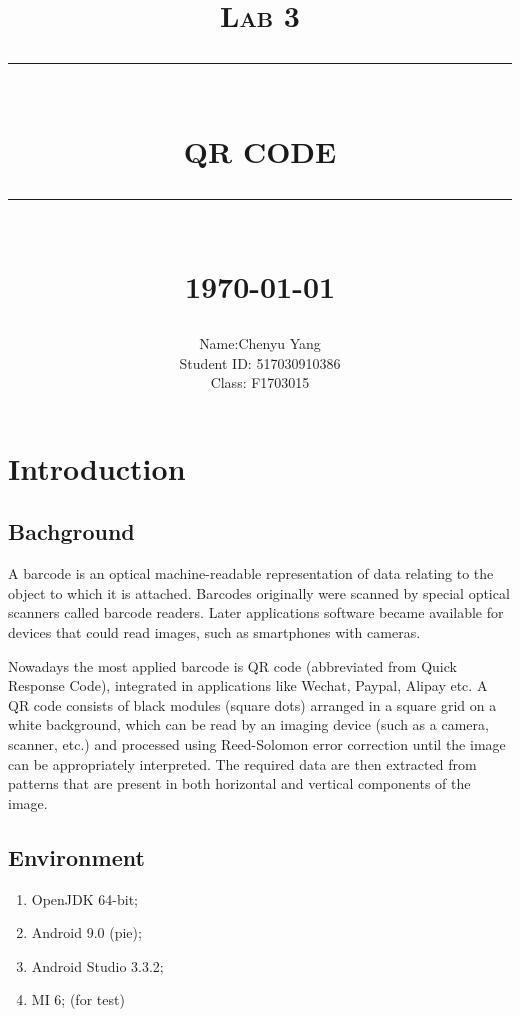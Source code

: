 \documentclass[12pt]{report}
\newcommand{\HRule}[1]{\rule{\linewidth}{#1}}
\begin{document}
\title{ \normalsize \textsc{Lab 3}
        \\ [2.0cm]
        \HRule{0.5pt} \\
        \LARGE \textbf{\uppercase{QR Code}}
        \HRule{2pt} \\ [0.5cm]
        \normalsize \today \vspace*{5\baselineskip}}

\date{}

\author{
        Name:Chenyu Yang \\
        Student ID: 517030910386 \\ 
        Class: F1703015 }

\maketitle
\tableofcontents
\newpage

\sectionfont{\scshape}


\section{Introduction}
\subsection{Bachground}
A barcode is an optical machine-readable representation of data relating to the object to which it is attached. Barcodes originally were scanned by special optical scanners called barcode readers. Later applications software became available for devices that could read images, such as smartphones with cameras.

Nowadays the most applied barcode is QR code (abbreviated from Quick Response Code), integrated in applications like 
Wechat, Paypal, Alipay etc. A QR code consists of black modules (square dots) 
arranged in a square grid on a white background, which can be read by an imaging 
device (such as a camera, scanner, etc.) and processed using Reed-Solomon error 
correction until the image can be appropriately interpreted. The required data are then 
extracted from patterns that are present in both horizontal and vertical components of the 
image.
\subsection{Environment}
\begin{enumerate}
	\item OpenJDK 64-bit;
	\item Android 9.0 (pie);
	\item Android Studio 3.3.2;
	\item MI 6; (for test)
\end{enumerate}
\end{document}
